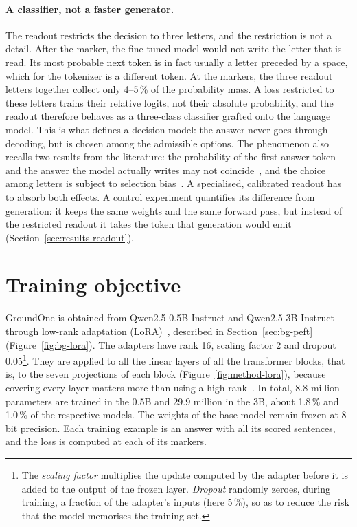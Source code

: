 \paragraph{A classifier, not a faster generator.} The readout restricts the decision to three letters, and the
restriction is not a detail. After the marker, the fine-tuned model would not write the letter that is read. Its most probable next token is in fact usually a letter preceded by a space, which for the tokenizer is a different token. At the
markers, the three readout letters together collect only 4--5\,\% of the probability mass. A loss restricted to
these letters trains their relative logits, not their absolute probability, and the readout therefore behaves as a
three-class classifier grafted onto the language model. This is what defines a decision model: the answer never goes
through decoding, but is chosen among the admissible options.
The phenomenon also recalls two results from the literature: the probability of the first answer token and the answer
the model actually writes may not coincide~\cite{wang2024myanswerc}, and the choice among letters is subject to
selection bias~\cite{zheng2024mcq}. A specialised, calibrated readout has to absorb both effects. A control experiment
quantifies its difference from generation: it keeps the same weights and the same forward pass, but instead of the
restricted readout it takes the token that generation would emit (Section~\ref{sec:results-readout}).


\section{Training objective}
\label{sec:method-training}

GroundOne is obtained from Qwen2.5-0.5B-Instruct and Qwen2.5-3B-Instruct~\cite{qwen2024qwen25} through low-rank
adaptation (LoRA)~\cite{hu2022lora}, described in Section~\ref{sec:bg-peft} (Figure~\ref{fig:bg-lora}). The adapters have rank 16, scaling factor 2 and dropout 0.05\footnote{The \emph{scaling
factor} multiplies the update computed by the adapter before it is added to the output of the frozen layer.
\emph{Dropout} randomly zeroes, during training, a fraction of the adapter's inputs (here 5\,\%), so as to reduce the
risk that the model memorises the training set.}. They are applied to all the linear layers of all the transformer
blocks, that is, to the seven projections of each block (Figure~\ref{fig:method-lora}), because covering every layer
matters more than using a high rank~\cite{dettmers2023qlora}. In total, 8.8 million parameters are trained in the 0.5B
and 29.9 million in the 3B, about 1.8\,\% and 1.0\,\% of the respective models. The weights of the base model
remain frozen at 8-bit precision. Each training example is an answer with all its scored sentences, and the loss is
computed at each of its markers.

